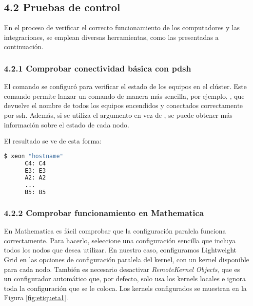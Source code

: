 \begin{spacing}{1.5}
  \subsection{4.2 Pruebas de control}
  \label{chap:4.2}
  En el proceso de verificar el correcto funcionamiento de los computadores y las integraciones, se emplean diversas herramientas, como las presentadas a continuación.

  \subsubsection {4.2.1 Comprobar conectividad básica con pdsh}

  El comando  se configuró para verificar el estado de los equipos
  en
  el clúster. Este comando permite lanzar un comando de manera más sencilla,
  por
  ejemplo, , que devuelve el nombre de
  todos los
  equipos encendidos y conectados correctamente por ssh. Además, si se utiliza
  el
  argumento  en vez de , se puede obtener más
  información sobre el estado de cada nodo.

  El resultado se ve de esta forma:


  \begin{lstlisting}[language=Bash]
      $ xeon "hostname"
      C4: C4
      E3: E3
      A2: A2
      ...
      B5: B5
  \end{lstlisting}

  \subsubsection{4.2.2 Comprobar funcionamiento en Mathematica}

  En Mathematica es fácil comprobar que la configuración paralela funciona
  correctamente. Para hacerlo, seleccione una configuración sencilla que
  incluya
  todos los nodos que desea utilizar. En nuestro caso, configuramos Lightweight
  Grid en las opciones de configuración paralela del kernel, con un kernel
  disponible para cada nodo. También es necesario desactivar
  \textit{RemoteKernel
    Objects}, que es un configurador automático que, por defecto, solo usa los
  kernels locales e ignora toda la configuración que se le coloca. Los kernels
  configurados se muestran en la Figura \ref{fig:etiqueta1}.  \newline  \newline


\end{spacing}
